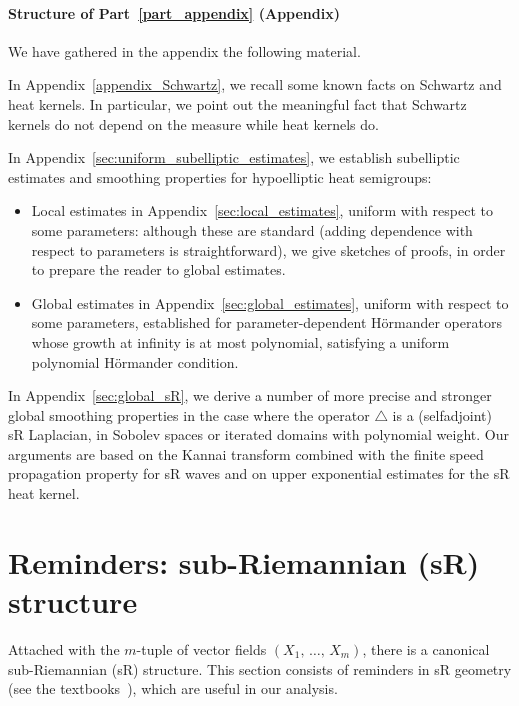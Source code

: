 \documentclass[AHL,Unicode,published]{cedram}
\begin{document}
\goodbreak
\paragraph{Structure of Part~\ref{part_appendix} (Appendix)}
We have gathered in the appendix the following material.

In Appendix~\ref{appendix_Schwartz}, we recall some known facts on Schwartz and heat kernels. In particular, we point out the meaningful fact that Schwartz kernels do not depend on the measure while heat kernels do.


In Appendix~\ref{sec:uniform_subelliptic_estimates}, we establish subelliptic estimates and smoothing properties for hypoelliptic heat semigroups:
\begin{itemize}
\item Local estimates in Appendix~\ref{sec:local_estimates}, uniform with respect to some parameters: although these are standard (adding dependence with respect to parameters is straightforward), we give sketches of proofs, in order to prepare the reader to global estimates.
\item Global estimates in Appendix~\ref{sec:global_estimates}, uniform with respect to some parameters, established for parameter-dependent H\"ormander operators whose growth at infinity is at most polynomial, satisfying a uniform polynomial H\"ormander condition.
\end{itemize}


In Appendix~\ref{sec:global_sR}, we derive a number of more precise and stronger global smoothing properties in the case where the operator $\triangle$ is a (selfadjoint) sR Laplacian, in Sobolev spaces or iterated domains with polynomial weight. Our arguments are based on the Kannai transform combined with the finite speed propagation property for sR waves and on upper exponential estimates for the sR heat kernel.



\section{Reminders: sub-Riemannian (sR) structure}\label{sec_sR}
Attached with the $m$-tuple of vector fields $(X_1,\,\ldots,\,X_m)$, there is a canonical sub-Riemannian (sR) structure. This section consists of reminders in sR geometry (see the textbooks~\cite{AgrachevBarilariBoscain_book2019, Bellaiche, Gromov, Jean_2014, LeDonne_book2017, Mo-02, Rifford_2014}), which are useful in our analysis.
\end{document}
